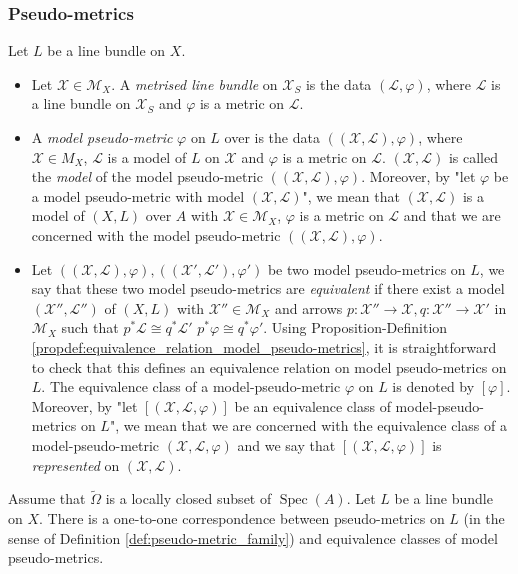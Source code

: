 \documentclass [11pt,reqno]{amsart}
\newcommand{\1}{\mathmybb{1}}
\def\cL{{\mathcal{L}}}
\def\cM{{\mathcal{M}}}
\def\cX{{\mathcal{X}}}
\def\Spec{\operatorname{Spec}}
\def\tilde{\widetilde}
\begin{document}
\subsubsection{Pseudo-metrics}

\begin{definition}
\label{def:pseudo-metric_family_integral}
Let $L$ be a line bundle on $X$. 
\begin{itemize}
	\item[(1)] Let $\cX\in\cM_{X}$. A \emph{metrised line bundle} on $\cX_{S}$ is the data $(\cL,\varphi)$, where $\cL$ is a line bundle on $\cX_{S}$ and $\varphi$ is a metric on $\cL$.
	\item[(2)] A \emph{model pseudo-metric} $\varphi$ on $L$ over is the data $((\cX,\cL),\varphi)$, where $\cX\in M_{X}$, $\cL$ is a model of $L$ on $\cX$ and $\varphi$ is a metric on $\cL$. $(\cX,\cL)$ is called the \emph{model} of the model pseudo-metric $((\cX,\cL),\varphi)$. Moreover, by "let $\varphi$ be a model pseudo-metric with model $(\cX,\cL)$", we mean that $(\cX,\cL)$ is a model of $(X,L)$ over $A$ with $\cX\in\cM_{X}$, $\varphi$ is a metric on $\cL$ and that we are concerned with the model pseudo-metric $((\cX,\cL),\varphi)$.
	\item[(3)] Let $\left((\cX,\cL),\varphi\right),\left((\cX',\cL'),\varphi'\right)$ be two model pseudo-metrics on $L$, we say that these two model pseudo-metrics are \emph{equivalent} if there exist a model $(\cX'',\cL'')$ of $(X,L)$ with $\cX''\in\cM_{X}$ and arrows $p:\cX''\to\cX, q:\cX''\to\cX'$ in $\cM_{X}$ such that $p^{\ast}\cL\cong q^{\ast}\cL'$ $p^{\ast}\varphi\cong q^{\ast}\varphi'$.
	Using Proposition-Definition \ref{propdef:equivalence_relation_model_pseudo-metrics}, it is straightforward to check that this defines an equivalence relation on model pseudo-metrics on $L$. The equivalence class of a model-pseudo-metric $\varphi$ on $L$ is denoted by $[\varphi]$. Moreover, by "let $[(\cX,\cL,\varphi)]$ be an equivalence class of model-pseudo-metrics on $L$", we mean that we are concerned with the equivalence class of a model-pseudo-metric $(\cX,\cL,\varphi)$ and we say that $[(\cX,\cL,\varphi)]$ is \emph{represented} on $(\cX,\cL)$.
\end{itemize}
\end{definition} 

\begin{proposition}
\label{prop:ZR_interpretation_pseudo-metrics_integral_tac}
Assume that $\tilde{\Omega}$ is a locally closed subset of $\Spec(A)$. Let $L$ be a line bundle on $X$. There is a one-to-one correspondence between pseudo-metrics on $L$ (in the sense of Definition \ref{def:pseudo-metric_family}) and equivalence classes of model pseudo-metrics.
\end{proposition}
\end{document}
